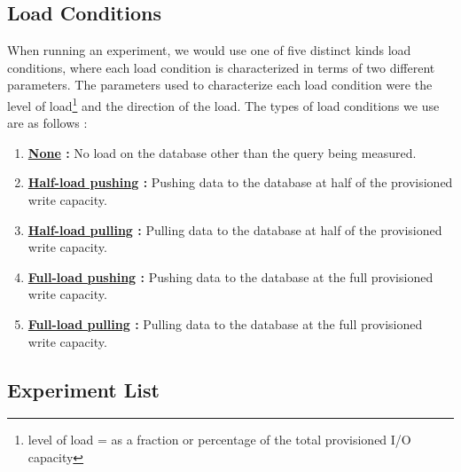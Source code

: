 
\subsection{Load Conditions}

When running an experiment, we would use one of five distinct kinds load conditions, where each load condition is characterized in terms of two different parameters.  The parameters used to characterize each load condition were the level of load\footnote{level of load = as a fraction or percentage of the total provisioned I/O capacity} and the direction of the load.  The types of load conditions we use are as follows :

\vspace{0.1in}
\begin{spacing}{1.2}
\begin{enumerate}[label=\large{\textbf{4-\alph*}):}]
	\item \textbf{\underline{None} :} No load on the database other than the query being measured.
	\vspace{0.05in}
	\item \textbf{\underline{Half-load pushing} :} Pushing data to the database at half of the provisioned write capacity.
	\vspace{0.05in}
	\item \textbf{\underline{Half-load pulling} :} Pulling data to the database at half of the provisioned write capacity.
	\vspace{0.05in}
	\item \textbf{\underline{Full-load pushing} :} Pushing data to the database at the full provisioned write capacity.
	\vspace{0.05in}
	\item \textbf{\underline{Full-load pulling} :} Pulling data to the database at the full provisioned write capacity.
\end{enumerate}
\end{spacing}



\subsection{Experiment List}








